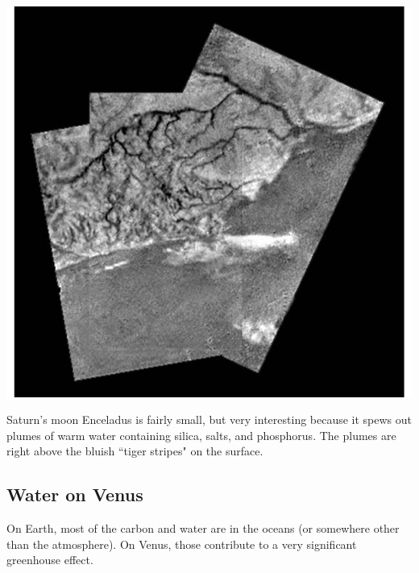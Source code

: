 \documentclass[class=article, crop=false]{standalone}
\begin{document}
\bigskip
\begin{center}
    \includegraphics[width=.6\textwidth]{titan2.jpg}
\end{center}
\par
Saturn's moon Enceladus is fairly small, but very interesting because it spews out plumes of warm water containing silica, salts, and phosphorus. The plumes are right above the bluish ``tiger stripes" on the surface.
\subsection{Water on Venus}
On Earth, most of the carbon and water are in the oceans (or somewhere other than the atmosphere). On Venus, those contribute to a very significant greenhouse effect.
\end{document}
